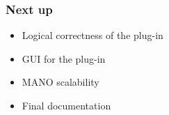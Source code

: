 \begin{frame}
\frametitle{Next up}

\begin{itemize}
	\item Logical correctness of the plug-in
	\item GUI for the plug-in
	\item MANO scalability
	\item Final documentation
	
	
\end{itemize}

\end{frame}